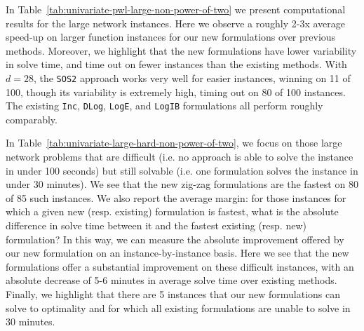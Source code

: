 \documentclass[opre,nonblindrev]{informs3} %
\newcommand{\MC}{\texttt{MC}}
\newcommand{\Log}{\texttt{LogE}}
\newcommand{\LogIB}{\texttt{LogIB}}
\newcommand{\DLog}{\texttt{DLog}}
\newcommand{\Inc}{\texttt{Inc}}
\newcommand{\SOS}{\texttt{SOS2}}
\begin{document}


In Table~\ref{tab:univariate-pwl-large-non-power-of-two} we present computational results for the large network instances. Here we observe a roughly 2-3x average speed-up on larger function instances for our new formulations over previous methods. Moreover, we highlight that the new formulations have lower variability in solve time, and time out on fewer instances than the existing methods. With $d=28$, the \SOS{} approach works very well for easier instances, winning on 11 of 100, though its variability is extremely high, timing out on 80 of 100 instances. The existing \Inc{}, \DLog{}, \Log{}, and \LogIB{} formulations all perform roughly comparably.

In Table~\ref{tab:univariate-large-hard-non-power-of-two}, we focus on those large network problems that are difficult (i.e. no approach is able to solve the instance in under 100 seconds) but still solvable (i.e. one formulation solves the instance in under 30 minutes). We see that the new zig-zag formulations are the fastest on 80 of 85 such instances. We also report the average margin: for those instances for which a given new (resp. existing) formulation is fastest, what is the absolute difference in solve time between it and the fastest existing (resp. new) formulation? In this way, we can measure the absolute improvement offered by our new formulation on an instance-by-instance basis. Here we see that the new formulations offer a substantial improvement on these difficult instances, with an absolute decrease of 5-6 minutes in average solve time over existing methods. Finally, we highlight that there are 5 instances that our new formulations can solve to optimality and for which all existing formulations are unable to solve in 30 minutes.
\end{document}
